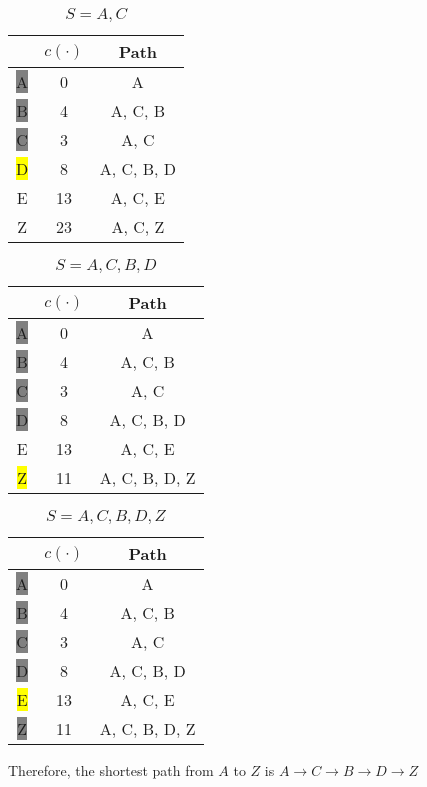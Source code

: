 \begin{eg}
\begin{minipage}{.3\textwidth}
  \begin{table}[H]
    \centering
    \begin{tabular}{c|c|c}
      \toprule
       & \(c(\cdot)\) & Path \\
    \midrule
    \colorbox{Gray}{A} & 0 & A  \\
    \colorbox{Gray}{B} & 4 & A, C, B  \\
    \colorbox{Gray}{C} & 3 & A, C  \\
    \colorbox{Yellow}{D} & 8 & A, C, B, D  \\
      E & 13 & A, C, E  \\
      Z & 23 & A, C, Z  \\
  \end{tabular}
    \caption*{\(S = A, C\)}
  \end{table}
\end{minipage}
\begin{minipage}{.3\textwidth}
  \begin{table}[H]
    \centering
    \begin{tabular}{c|c|c}
      \toprule
       & \(c(\cdot)\) & Path \\
    \midrule
    \colorbox{Gray}{A} & 0 & A  \\
    \colorbox{Gray}{B} & 4 & A, C, B  \\
    \colorbox{Gray}{C} & 3 & A, C  \\
    \colorbox{Gray}{D} & 8 & A, C, B, D  \\
      E & 13 & A, C, E  \\
    \colorbox{Yellow}{Z} & 11 & A, C, B, D, Z  \\
  \end{tabular}
    \caption*{\(S = A, C, B, D\)}
  \end{table}
\end{minipage}
\begin{minipage}{.3\textwidth}
  \begin{table}[H]
    \centering
    \begin{tabular}{c|c|c}
      \toprule
       & \(c(\cdot)\) & Path \\
    \midrule
    \colorbox{Gray}{A} & 0 & A  \\
    \colorbox{Gray}{B} & 4 & A, C, B  \\
    \colorbox{Gray}{C} & 3 & A, C  \\
    \colorbox{Gray}{D} & 8 & A, C, B, D  \\
    \colorbox{Yellow}{E} & 13 & A, C, E  \\
    \colorbox{Gray}{Z} & 11 & A, C, B, D, Z  \\
  \end{tabular}
    \caption*{\(S = A, C, B, D, Z\)}
  \end{table}
\end{minipage}

Therefore, the shortest path from \(A\) to \(Z\) is \(A \to C \to B \to D \to Z\) 
\end{eg}
